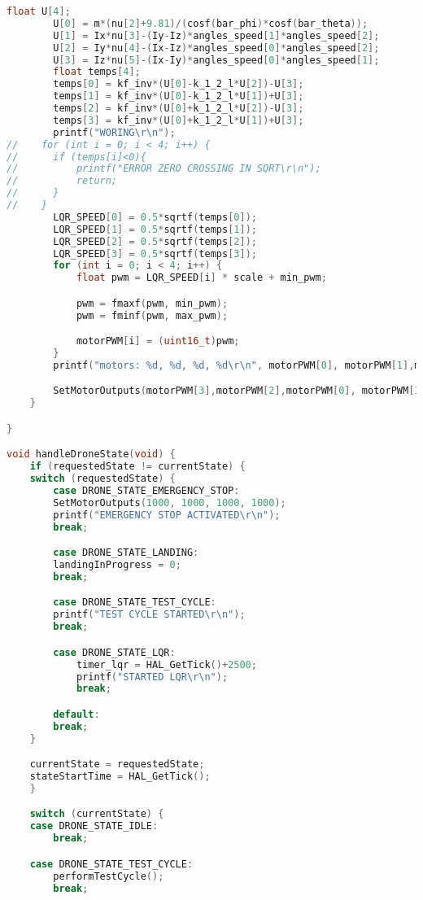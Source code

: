 \begin{lstlisting}[language=C++]
        float U[4];
        U[0] = m*(nu[2]+9.81)/(cosf(bar_phi)*cosf(bar_theta));
        U[1] = Ix*nu[3]-(Iy-Iz)*angles_speed[1]*angles_speed[2];
        U[2] = Iy*nu[4]-(Ix-Iz)*angles_speed[0]*angles_speed[2];
        U[3] = Iz*nu[5]-(Ix-Iy)*angles_speed[0]*angles_speed[1];
        float temps[4];
        temps[0] = kf_inv*(U[0]-k_1_2_l*U[2])-U[3];
        temps[1] = kf_inv*(U[0]-k_1_2_l*U[1])+U[3];
        temps[2] = kf_inv*(U[0]+k_1_2_l*U[2])-U[3];
        temps[3] = kf_inv*(U[0]+k_1_2_l*U[1])+U[3];
        printf("WORING\r\n");
//	  for (int i = 0; i < 4; i++) {
//		if (temps[i]<0){
//			printf("ERROR ZERO CROSSING IN SQRT\r\n");
//			return;
//		}
//	  }
        LQR_SPEED[0] = 0.5*sqrtf(temps[0]);
        LQR_SPEED[1] = 0.5*sqrtf(temps[1]);
        LQR_SPEED[2] = 0.5*sqrtf(temps[2]);
        LQR_SPEED[3] = 0.5*sqrtf(temps[3]);
        for (int i = 0; i < 4; i++) {
            float pwm = LQR_SPEED[i] * scale + min_pwm;

            pwm = fmaxf(pwm, min_pwm);
            pwm = fminf(pwm, max_pwm);

            motorPWM[i] = (uint16_t)pwm;
        }
        printf("motors: %d, %d, %d, %d\r\n", motorPWM[0], motorPWM[1],motorPWM[2],motorPWM[3]);

        SetMotorOutputs(motorPWM[3],motorPWM[2],motorPWM[0], motorPWM[1]);
    }

}

void handleDroneState(void) {
    if (requestedState != currentState) {
    switch (requestedState) {
        case DRONE_STATE_EMERGENCY_STOP:
        SetMotorOutputs(1000, 1000, 1000, 1000);
        printf("EMERGENCY STOP ACTIVATED\r\n");
        break;

        case DRONE_STATE_LANDING:
        landingInProgress = 0;
        break;

        case DRONE_STATE_TEST_CYCLE:
        printf("TEST CYCLE STARTED\r\n");
        break;

        case DRONE_STATE_LQR:
            timer_lqr = HAL_GetTick()+2500;
            printf("STARTED LQR\r\n");
            break;

        default:
        break;
    }

    currentState = requestedState;
    stateStartTime = HAL_GetTick();
    }

    switch (currentState) {
    case DRONE_STATE_IDLE:
        break;

    case DRONE_STATE_TEST_CYCLE:
        performTestCycle();
        break;


\end{lstlisting}
